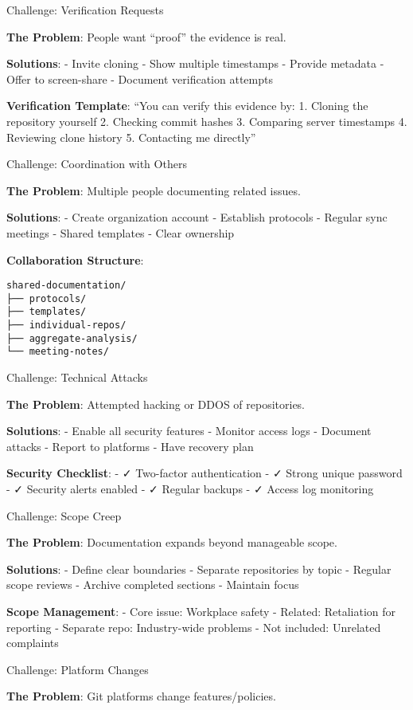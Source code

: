 Challenge: Verification Requests

\textbf{The Problem}: People want ``proof'' the evidence is real.

\textbf{Solutions}: - Invite cloning - Show multiple timestamps -
Provide metadata - Offer to screen-share - Document verification
attempts

\textbf{Verification Template}: ``You can verify this evidence by: 1.
Cloning the repository yourself 2. Checking commit hashes 3. Comparing
server timestamps 4. Reviewing clone history 5. Contacting me directly''

Challenge: Coordination with Others

\textbf{The Problem}: Multiple people documenting related issues.

\textbf{Solutions}: - Create organization account - Establish protocols
- Regular sync meetings - Shared templates - Clear ownership

\textbf{Collaboration Structure}:

\begin{verbatim}
shared-documentation/
├── protocols/
├── templates/
├── individual-repos/
├── aggregate-analysis/
└── meeting-notes/
\end{verbatim}

Challenge: Technical Attacks

\textbf{The Problem}: Attempted hacking or DDOS of repositories.

\textbf{Solutions}: - Enable all security features - Monitor access logs
- Document attacks - Report to platforms - Have recovery plan

\textbf{Security Checklist}: - ✓ Two-factor authentication - ✓ Strong
unique password - ✓ Security alerts enabled - ✓ Regular backups - ✓
Access log monitoring

Challenge: Scope Creep

\textbf{The Problem}: Documentation expands beyond manageable scope.

\textbf{Solutions}: - Define clear boundaries - Separate repositories by
topic - Regular scope reviews - Archive completed sections - Maintain
focus

\textbf{Scope Management}: - Core issue: Workplace safety - Related:
Retaliation for reporting - Separate repo: Industry-wide problems - Not
included: Unrelated complaints

Challenge: Platform Changes

\textbf{The Problem}: Git platforms change features/policies.

